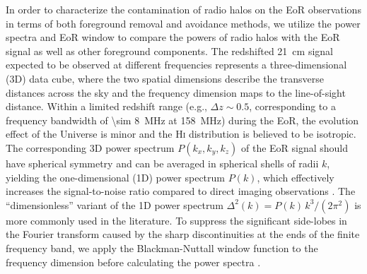\documentclass[twocolumn]{aastex62}
\newcommand{\Hi}{H\textsc{i}}
\begin{document}
In order to characterize the contamination of radio halos on the EoR
observations in terms of both foreground removal and avoidance methods,
we utilize the power spectra and EoR window to compare the powers of
radio halos with the EoR signal as well as other foreground components.
The redshifted 21~cm signal expected to be observed at different
frequencies represents a three-dimensional (3D) data cube, where the
two spatial dimensions describe the transverse distances across the sky
and the frequency dimension maps to the line-of-sight distance.
Within a limited redshift range (e.g., $\Delta z \sim 0.5$, corresponding
to a frequency bandwidth of \SI{\sim 8}{\MHz} at \SI{158}{\MHz})
during the EoR, the evolution effect of the Universe is minor and the
\Hi{} distribution is believed to be isotropic.
The corresponding 3D power spectrum $P(k_x, k_y, k_z)$ of the EoR signal
should have spherical symmetry and can be averaged in spherical shells
of radii $k$, yielding the one-dimensional (1D) power spectrum $P(k)$,
which effectively increases the signal-to-noise ratio compared to
direct imaging observations \citep{morales2004,morales2006,datta2010}.
The \enquote{dimensionless} variant of the 1D power spectrum
$\Delta^2(k) = P(k) \,k^3 / (2\pi^2)$
is more commonly used in the literature.
To suppress the significant side-lobes in the Fourier transform caused
by the sharp discontinuities at the ends of the finite frequency band,
we apply the Blackman-Nuttall window function to the frequency dimension
before calculating the power spectra \citep[e.g.,][]{trott2015,chapman2016}.
\end{document}
